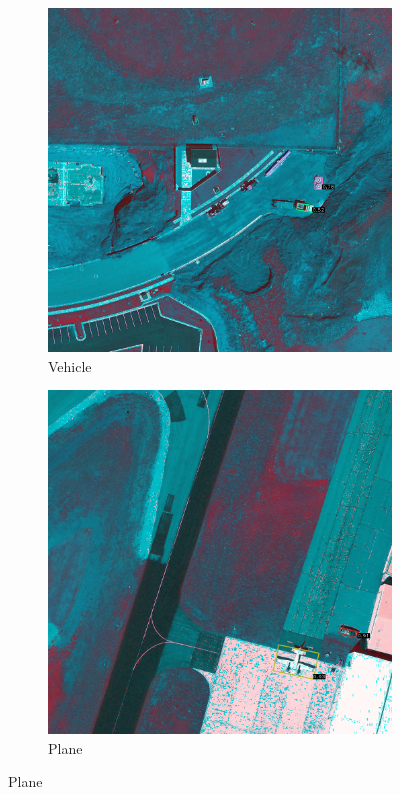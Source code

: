 \begin{figure}[h!]
    \begin{subfigure}[t]{0.38\textwidth}
        \centering
        \includegraphics[width=\linewidth]{images/015Results/02perm_exp/comp_images/gbndvi/427.png}
        \caption{Vehicle}
    \end{subfigure}
    \begin{subfigure}[t]{0.38\textwidth}
        \centering
        \includegraphics[width=\linewidth]{images/015Results/02perm_exp/comp_images/gbndvi/487.png}
        \caption{Plane}
    \end{subfigure}
    

\end{figure}
